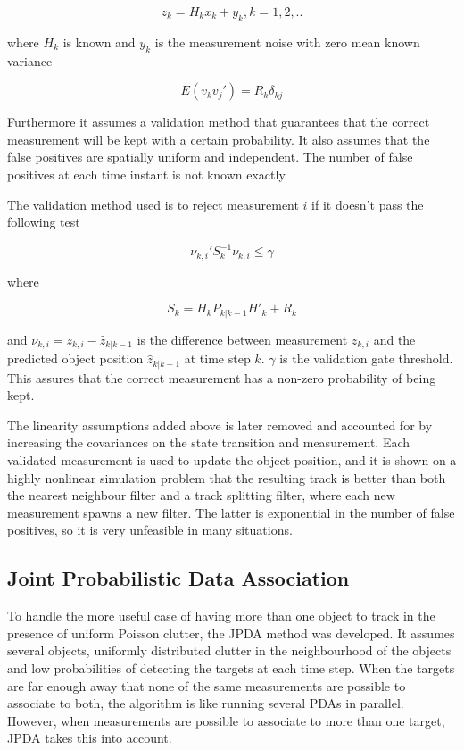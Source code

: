 \begin{equation}
    z_k = H_kx_k + y_k, k = 1,2,..
\end{equation}

where $H_k$ is known and $y_k$ is the measurement noise with zero mean known variance 

\begin{equation}
    E(v_kv_j') = R_k\delta_{kj}
\end{equation}



Furthermore it assumes a validation method that guarantees that the correct measurement will be kept with a certain probability. It also assumes that the false positives are spatially uniform and independent. The number of false positives at each time instant is not known exactly.   

The validation method used is to reject measurement $i$ if it doesn't pass the following test

\begin{equation}
    \nu_{k,i}'S_k^{-1}\nu_{k,i} \leq \gamma
\end{equation}

where 

\begin{equation}
    S_k = H_kP_{k|k-1}H'_k+R_k
\end{equation}

and $\nu_{k,i} = z_{k,i} - \hat{z}_{k|k-1}$ is the difference between measurement $z_{k,i}$ and the predicted object position $\hat{z}_{k|k-1}$ at time step $k$. $\gamma$ is the validation gate threshold. This assures that the correct measurement has a non-zero probability of being kept. 

The linearity assumptions added above is later removed and accounted for by increasing the covariances on the state transition and measurement. Each validated measurement is used to update the object position, and it is shown on a highly nonlinear simulation problem that the resulting track is better than both the nearest neighbour filter and a track splitting filter, where each new measurement spawns a new filter. The latter is exponential in the number of false positives, so it is very unfeasible in many situations. 

\subsection{Joint Probabilistic Data Association}

To handle the more useful case of having more than one object to track in the presence of uniform Poisson clutter, the \gls{JPDA} method was developed\cite{JPDA}. It assumes several objects, uniformly distributed clutter in the neighbourhood of the objects and low probabilities of detecting the targets at each time step. When the targets are far enough away that none of the same measurements are possible to associate to both, the algorithm is like running several \glspl{PDA} in parallel. However, when measurements are possible to associate to more than one target, \gls{JPDA} takes this into account. 

